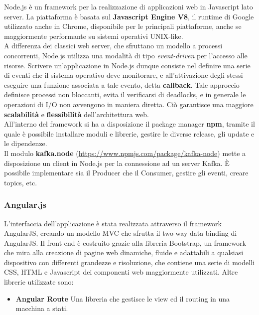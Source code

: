\documentclass[11pt]{article}
\begin{document}
Node.js è un framework per la realizzazione di applicazioni web in Javascript lato server. La piattaforma è basata sul \textbf{Javascript Engine V8}, il runtime di Google utilizzato anche in Chrome, disponibile per le principali piattaforme, anche se maggiormente performante su sistemi operativi UNIX-like.\\

A differenza dei classici web server, che sfruttano un modello a processi concorrenti, Node.js utilizza una modalità di tipo \textit{event-driven} per l'accesso alle risorse. Scrivere un'applicazione in Node.js dunque consiste nel definire una serie di eventi che il sistema operativo deve monitorare, e all'attivazione degli stessi eseguire una funzione associata a tale evento, detta \textbf{callback}. Tale approccio definisce processi non bloccanti, evita il verificarsi di deadlocks, e in generale le operazioni di I/O non avvengono in maniera diretta. Ciò garantisce una maggiore \textbf{scalabilità} e \textbf{flessibilità} dell'architettura web. \\

All'interno del framework si ha a disposizione il package manager \textbf{npm}, tramite il quale è possibile installare moduli e librerie, gestire le diverse release, gli update e le dipendenze.\\

Il modulo \textbf{kafka.node} (\href{https://www.npmjs.com/package/kafka-node}{https://www.npmjs.com/package/kafka-node}) mette a disposizione un client in Node.js per la connessione ad un server Kafka. \`E possibile implementare sia il Producer che il Consumer, gestire gli eventi, creare topics, etc.

\subsubsection{Angular.js}

L'interfaccia dell'applicazione è stata realizzata attraverso il framework AngularJS, creando un modello MVC che sfrutta il two-way data binding di AngularJS. Il front end è costruito grazie alla libreria Bootstrap, un framework che mira alla creazione di pagine web dinamiche, fluide e adattabili a qualsiasi dispositivo con differenti grandezze e risoluzione, che contiene una serie di modelli CSS, HTML e Javascript dei componenti web maggiormente utilizzati. Altre librerie utilizzate sono: 
\begin{itemize}
	\item \textbf{Angular Route} Una libreria che gestisce le view ed il routing in una macchina a stati.
\end{itemize}
\end{document}
